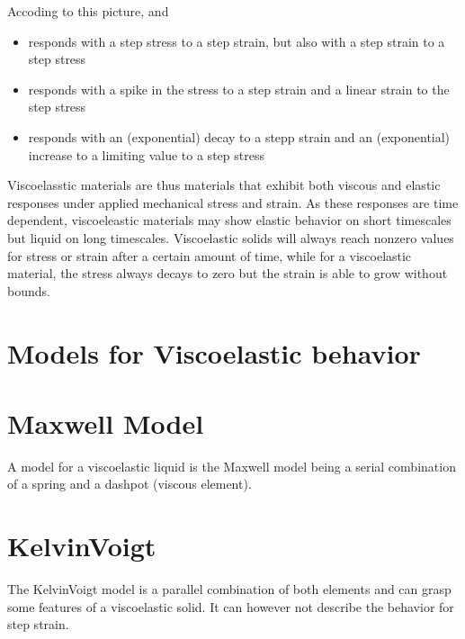 \documentclass[letterpaper,10pt,english]{sphinxmanual}
\let\sphinxpxdimen\pdfpxdimen\else\newdimen\sphinxpxdimen
\begin{document}
\noindent\sphinxincludegraphics[width=828\sphinxpxdimen,height=505\sphinxpxdimen]{{response}.png}

\sphinxAtStartPar
Accoding to this picture, and
\begin{itemize}
\item {} 
\sphinxAtStartPar
{} responds with a step stress to a step strain, but also with a step strain to a step stress

\item {} 
\sphinxAtStartPar
{} responds with a spike in the stress to a step strain and a linear strain to the step stress

\item {} 
\sphinxAtStartPar
{} responds with an (exponential) decay to a stepp strain and an (exponential) increase to a limiting value to a step stress

\end{itemize}

\sphinxAtStartPar
Viscoelasstic materials are thus materials that exhibit both viscous and elastic responses under applied mechanical stress and strain. As these responses are time dependent, viscoeleastic materials may show elastic behavior on short timescales but liquid on long timescales. Viscoelastic solids will always reach non\sphinxhyphen{}zero values for stress or strain after a certain amount of time, while for a viscoelastic material, the stress always decays to zero but the strain is able to grow without bounds.


\section{Models for Viscoelastic behavior}
\label{\detokenize{notebooks/L23/2_Viscoelasticity:Models-for-Viscoelastic-behavior}}

\section{Maxwell Model}
\label{\detokenize{notebooks/L23/2_Viscoelasticity:Maxwell-Model}}
\sphinxAtStartPar
A model for a viscoelastic liquid is the Maxwell model being a serial combination of a spring and a dashpot (viscous element).

\noindent\sphinxincludegraphics[width=310\sphinxpxdimen,height=158\sphinxpxdimen]{{maxwell}.png}


\section{Kelvin\sphinxhyphen{}Voigt}
\label{\detokenize{notebooks/L23/2_Viscoelasticity:Kelvin-Voigt}}
\sphinxAtStartPar
The Kelvin\sphinxhyphen{}Voigt model is a parallel combination of both elements and can grasp some features of a viscoelastic solid. It can however not describe the behavior for step strain.
\end{document}
